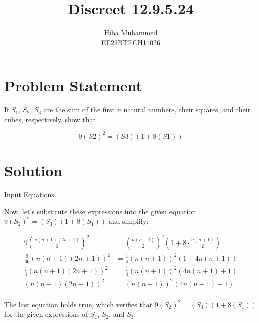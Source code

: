 \documentclass[12pt]{article}
\begin{document}
\title{Discreet 12.9.5.24}
\author{Hiba Muhammed \\
        EE23BTECH11026}
\maketitle

\section*{Problem Statement}
If \(S_1\), \(S_2\), \(S_3\) are the sum of the first \(n\) natural numbers, their squares, and their cubes, respectively, show that 

\[ 9(S\scriptstyle 2)^2 = (S\scriptstyle 3)(1 + 8(S\scriptstyle 1)) \]

\section*{Solution}

\begin{table}[h]
  \centering
  
  \caption{Input Equations}
  \label{tab:input-equations}
  
\end{table}

Now, let's substitute these expressions into the given equation \(9(S_2)^2 = (S_3)(1 + 8(S_1))\) and simplify:

\begin{align*}
    9\left(\frac{n(n+1)(2n+1)}{6}\right)^2 &= \left(\frac{n(n+1)}{2}\right)^2 \left(1 + 8 \cdot \frac{n(n+1)}{2}\right) \\
    \frac{9}{36}\left(n(n+1)(2n+1)\right)^2 &= \frac{1}{4}\left(n(n+1)\right)^2 \left(1 + 4n(n+1)\right) \\
    \frac{1}{4}\left(n(n+1)(2n+1)\right)^2 &= \frac{1}{4}\left(n(n+1)\right)^2 \left(4n(n+1) + 1\right) \\
    \left(n(n+1)(2n+1)\right)^2 &= \left(n(n+1)\right)^2 \left(4n(n+1) + 1\right) \\
\end{align*}

The last equation holds true, which verifies that \(9(S_2)^2 = (S_3)(1 + 8(S_1))\) for the given expressions of \(S_1\), \(S_2\), and \(S_3\).
\end{document}
